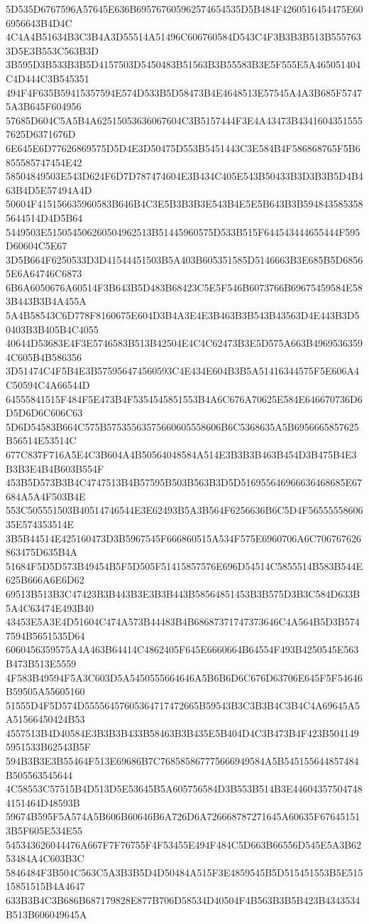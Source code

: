{{{{{{{{{{{{{{{{{{{{{5D535D6767596A57645E636B695767605962574654535D5B484F4260516454475E606956643B4D4C
4C4A4B51634B3C3B4A3D55514A51496C606760584D543C4F3B3B3B513B5557633D5E3B553C563B3D
3B595D3B533B3B5D4157503D5450483B51563B3B55583B3E5F555E5A465051404C4D444C3B545351
494F4F635B59415357594E574D533B5D58473B4E4648513E57545A4A3B685F57475A3B645F604956
57685D604C5A5B4A62515053636067604C3B5157444F3E4A43473B43416043515557625D6371676D
6E645E6D77626869575D5D4E3D50475D553B5451443C3E584B4F586868765F5B6855585747454E42
58504849503E543D624F6D7D787474604E3B434C405E543B50433B3D3B3B5D4B463B4D5E57494A4D
50604F415156635960583B646B4C3E5B3B3B3E543B4E5E5B643B3B5948435853585644514D4D5B64
5449503E515054506260504962513B51445960575D533B515F644543444655444F595D60604C5E67
3D5B664F6250533D3D41544451503B5A403B605351585D5146663B3E685B5D68565E6A64746C6873
6B6A6050676A60514F3B643B5D483B68423C5E5F546B6073766B69675459584E583B443B3B4A455A
5A4B58543C6D778F8160675E604D3B4A3E4E3B463B3B543B43563D4E443B3D50403B3B405B4C4055
40644D53683E4F3E5746583B513B42504E4C4C62473B3E5D575A663B49695363594C605B4B586356
3D51474C4F5B4E3B575956474560593C4E434E604B3B5A51416344575F5E606A4C50594C4A66544D
64555841515F484F5E473B4F5354545851553B4A6C676A70625E584E646670736D6D5D6D6C606C63
5D6D54583B664C575B57535563575660605558606B6C5368635A5B6956665857625B56514E53514C
677C837F716A5E4C3B604A4B50564048584A514E3B3B3B463B454D3B475B4E3B3B3E4B4B603B554F
453B5D573B3B4C4747513B4B57595B503B563B3D5D516955646966636468685E67684A5A4F503B4E
553C505551503B40514746544E3E62493B5A3B564F6256636B6C5D4F5655555860635E574353514E
3B5B44514E425160473D3B5967545F666860515A534F575E6960706A6C706767626863475D635B4A
51684F5D5D573B49454B5F5D505F51415857576E696D54514C5855514B583B544E625B666A6E6D62
69513B513B3C47423B3B443B3E3B3B443B58564851453B3B575D3B3C584D633B5A4C63474E493B40
43453E5A3E4D51604C474A573B44483B4B68687371747373646C4A564B5D3B5747594B5651535D64
6060456359575A4A463B64414C4862405F645E6660664B64554F493B4250545E563B473B513E5559
4F583B49594F5A3C603D5A5450555664646A5B6B6D6C676D63706E645F5F54646B59505A55605160
51555D4F5D574D55556457605364717472665B59543B3C3B3B4C3B4C4A69645A5A51566450424B53
4557513B4D40584E3B3B3B433B58463B3B435E5B404D4C3B473B4F423B5041495951533B62543B5F
594B3B3E3B55464F513E69686B7C768585867775666949584A5B545155644857484B505563545644
4C58553C57515B4D513D5E53645B5A605756584D3B553B514B3E446043575047484151464D48593B
59674B595F5A574A5B606B60646B6A726D6A726668787271645A60635F676451513B5F605E534E55
545343626044476A667F7F76755F4F53455E494F484C5D663B66556D545E5A3B6253484A4C603B3C
5846484F3B504C563C5A3B3B5D4D50484A515F3E4859545B5D515451553B5E51515851515B4A4647
633B3B4C3B686B687179828E877B706D58534D40504F4B563B3B5B423B4343534B513B606049645A
}}}}}}}}}}}}}}}}}}}}}
